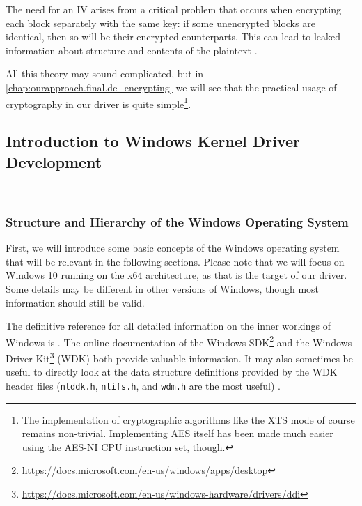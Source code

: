 The need for an IV arises from a critical problem that occurs when encrypting each block separately with the same key: if some unencrypted blocks are identical, then so will be their encrypted counterparts. This can lead to leaked information about structure and contents of the plaintext \cite{Ferguson2010}.

All this theory may sound complicated, but in \autoref{chap:ourapproach.final.de_encrypting} we will see that the practical usage of cryptography in our driver is quite simple\footnote{\label{fn:background.luks2.simplecryptography} The implementation of cryptographic algorithms like the XTS mode of course remains non-trivial. Implementing AES itself has been made much easier using the AES-NI CPU instruction set, though.}.

\subsection{Introduction to Windows Kernel Driver Development}
\label{chap:background.kerneldriver}
\\

\subsubsection{Structure and Hierarchy of the Windows Operating System}
\label{chap:background.kerneldriver.oshierarchy}
First, we will introduce some basic concepts of the Windows operating system that will be relevant in the following sections. Please note that we will focus on Windows 10 running on the x64 architecture, as that is the target of our driver. Some details may be different in other versions of Windows, though most information should still be valid.

The definitive reference for all detailed information on the inner workings of Windows is \cite{Yosifovich2017}. The online documentation of the Windows SDK\footnote{\label{fn:background.kerneldriver.sdkdoc} \url{https://docs.microsoft.com/en-us/windows/apps/desktop}} and the Windows Driver Kit\footnote{\label{fn:background.kerneldriver.wdkdoc} \url{https://docs.microsoft.com/en-us/windows-hardware/drivers/ddi}} (WDK) both provide valuable information. It may also sometimes be useful to directly look at the data structure definitions provided by the WDK header files (\texttt{ntddk.h}, \texttt{ntifs.h}, and \texttt{wdm.h} are the most useful) \cite{Yosifovich2017}.

